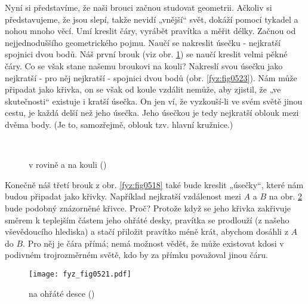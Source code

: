     Nyní si představíme, že naši brouci začnou studovat geometrii. Ačkoliv si představujeme, že 
    jsou slepí, takže nevidí „vnější“ svět, dokáží pomocí tykadel a nohou mnoho věcí. Umí kreslit 
    čáry, vyrábět pravítka a měřit délky. Začnou od nejjednoduššího geometrického pojmu. Naučí se 
    nakreslit úsečku - nejkratší spojnici dvou bodů. Náš první brouk (viz obr. \ref{fyz:fig0519}) se 
    naučí kreslit velmi pěkné čáry. Co se však stane našemu broukovi na kouli? Nakreslí svou úsečku 
    jako nejkratší - pro něj nejkratší - spojnici dvou bodů (obr. \ref{fyz:fig0523}). Nám může 
    připadat jako křivka, on  se však od koule vzdálit nemůže, aby zjistil, že „ve skutečnosti“ 
    existuje i kratší úsečka. On jen ví, že vyzkouší-li ve svém světě jinou cestu, je každá delší 
    než jeho úsečka. Jeho úsečkou je tedy nejkratší oblouk mezi dvěma body. (Je to, samozřejmě, 
    oblouk tzv. hlavní kružnice.)

    \begin{figure}[ht!] %
      \centering  
          \\
      \caption{ v rovině a na kouli (\cite[s.~776]{Feynman02})}
      \label{fyz:fig0519}
    \end{figure}  
    
    Konečně náš třetí brouk z obr. \ref{fyz:fig0518} také bude kreslit „úsečky“, které nám budou 
    připadat jako křivky. Například nejkratší vzdálenost mezi \(A\) a \(B\) na obr. 
    \ref{fyz:fig0521} bude podobný znázorněné křivce. Proč? Protože když se jeho křivka zakřivuje 
    směrem k teplejším částem jeho ohřáté desky, pravítka se prodlouží (z našeho vševědoucího 
    hlediska) a stačí přiložit pravítko méně krát, abychom dosáhli z \(A\) do \(B\). Pro něj je 
    čára přímá; nemá možnost vědět, že může existovat kdosi v podivném trojrozměrném světě, kdo by 
    za přímku považoval jinou čáru.
    
    \begin{figure}[ht!] %
      \centering
      \texttt{[image: fyz\_fig0521.pdf]}
      \caption{ na ohřáté desce (\cite[s.~776]{Feynman02})}
      \label{fyz:fig0521}
    \end{figure}
    
